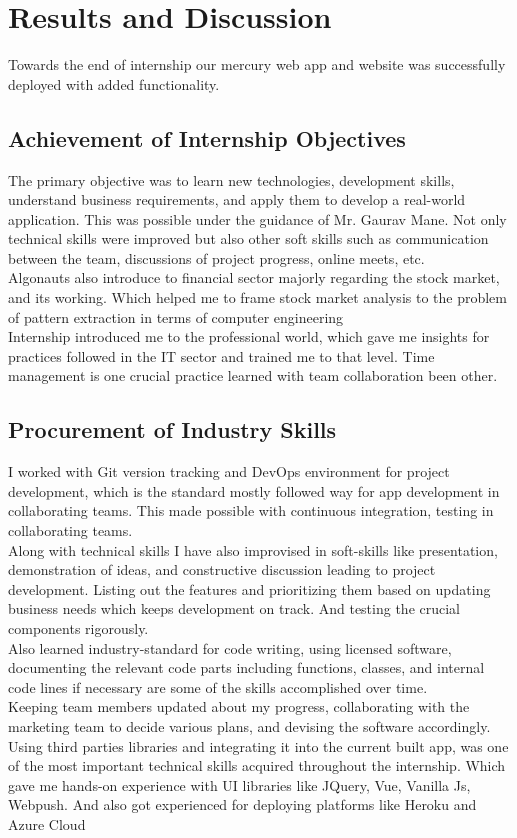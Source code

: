 \chapter{Results and Discussion}
Towards the end of internship our mercury web app and website was successfully deployed with added functionality.
\section{Achievement of Internship Objectives}

\tab The primary objective was to learn new technologies, development skills, understand business requirements, and apply them to develop a real-world application. This was possible under the guidance of Mr. Gaurav Mane. Not only technical skills were improved but also other soft skills such as communication between the team, discussions of project progress, online meets, etc.\\
\tab Algonauts also introduce to financial sector majorly regarding the stock market, and its working. Which helped me to frame stock market analysis to the problem of pattern extraction in terms of computer engineering \\
\tab Internship introduced me to the professional world, which gave me insights for practices followed in the IT sector and trained me to that level. Time management is one crucial practice learned with team collaboration been other.  


\section{Procurement of Industry Skills}
\tab I worked with Git version tracking and DevOps environment for project development, which is the standard mostly followed way for app development in collaborating teams. This made possible with continuous integration, testing in collaborating teams.\\
Along with technical skills I have also improvised in soft-skills like presentation, demonstration of ideas, and constructive discussion leading to project development.
Listing out the features and prioritizing them based on updating business needs which keeps development on track. And testing the crucial components rigorously.\\
\tab Also learned industry-standard for code writing, using licensed software, documenting the relevant code parts including functions, classes, and internal code lines if necessary are some of the skills accomplished over time.\\
\tab Keeping team members updated about my progress, collaborating with the marketing team to decide various plans, and devising the software accordingly.\\
\tab Using third parties libraries and integrating it into the current built app, was one of the most important technical skills acquired throughout the internship. Which gave me hands-on experience with UI libraries like JQuery, Vue, Vanilla Js, Webpush. And also got experienced for deploying platforms like Heroku and Azure Cloud


